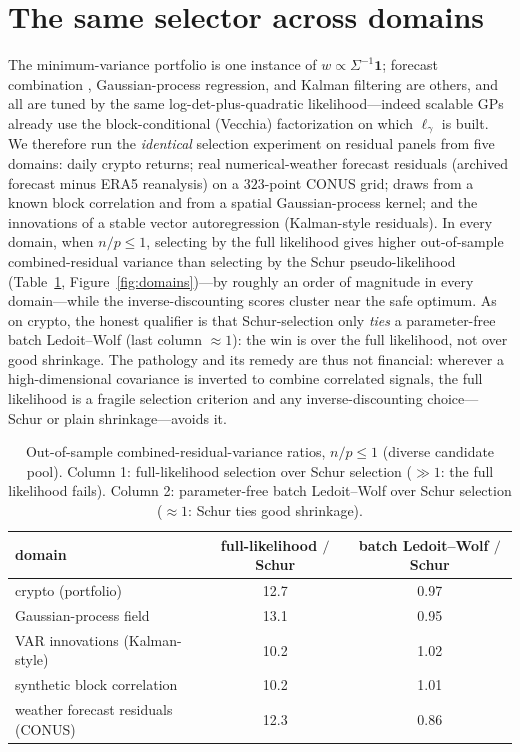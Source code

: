 \documentclass[11pt]{article}
\begin{document}
\section{The same selector across domains}
The minimum-variance portfolio is one instance of $w\propto\Sigma^{-1}\mathbf1$; forecast combination
\citep{markowitz1952}, Gaussian-process regression, and Kalman filtering are others, and all are tuned
by the same log-det-plus-quadratic likelihood---indeed scalable GPs already use the block-conditional
(Vecchia) factorization \citep{vecchia1988,katzfuss2021} on which $\ell_\gamma$ is built. We therefore
run the \emph{identical} selection experiment on residual panels from five domains: daily crypto
returns; real numerical-weather forecast residuals (archived forecast minus ERA5 reanalysis) on a
$323$-point CONUS grid; draws from a known block correlation and from a spatial Gaussian-process
kernel; and the innovations of a stable vector autoregression (Kalman-style residuals). In every
domain, when $n/p\le1$, selecting by the full likelihood gives higher out-of-sample combined-residual
variance than selecting by the Schur pseudo-likelihood (Table~\ref{tab:domains},
Figure~\ref{fig:domains})---by roughly an order of magnitude in every domain---while the
inverse-discounting scores cluster near the safe optimum. As on crypto, the honest qualifier is that
Schur-selection only \emph{ties} a parameter-free batch Ledoit--Wolf (last column $\approx1$): the win
is over the full likelihood, not over good shrinkage. The pathology and its remedy are thus not
financial: wherever a high-dimensional covariance is inverted to combine correlated signals, the full
likelihood is a fragile selection criterion and any inverse-discounting choice---Schur or plain
shrinkage---avoids it.

\begin{table}[h]\centering\small
\caption{Out-of-sample combined-residual-variance ratios, $n/p\le1$ (diverse candidate pool). Column 1:
full-likelihood selection over Schur selection ($\gg1$: the full likelihood fails). Column 2:
parameter-free batch Ledoit--Wolf over Schur selection ($\approx1$: Schur ties good shrinkage).}
\label{tab:domains}
\begin{tabular}{lcc}
\toprule
domain & full-likelihood $/$ Schur & batch Ledoit--Wolf $/$ Schur\\
\midrule
crypto (portfolio)                & 12.7 & 0.97\\
Gaussian-process field            & 13.1 & 0.95\\
VAR innovations (Kalman-style)    & 10.2 & 1.02\\
synthetic block correlation       & 10.2 & 1.01\\
weather forecast residuals (CONUS)& 12.3 & 0.86\\
\bottomrule
\end{tabular}
\end{table}
\end{document}
